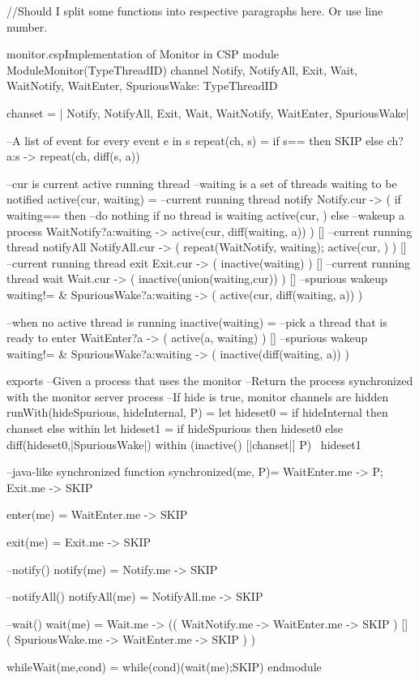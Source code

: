\documentclass{article}
\begin{document}
//Should I split some functions into respective paragraphs here. Or use line number. 
\begin{cspfloat}{monitor.csp}{Implementation of Monitor in CSP}
  module ModuleMonitor(TypeThreadID)
  channel
    Notify, NotifyAll, Exit, Wait,
    WaitNotify, WaitEnter, SpuriousWake: TypeThreadID

  chanset = {| Notify, NotifyAll, Exit, Wait, WaitNotify, WaitEnter, SpuriousWake|}

  --A list of event for every event e in s
  repeat(ch, s) =
    if s=={} then SKIP
    else ch?a:s -> repeat(ch, diff(s, {a}))

  --cur is current active running thread
  --waiting is a set of threads waiting to be notified
  active(cur, waiting) =
    --current running thread notify
    Notify.cur -> (
      if waiting=={} then 
        --do nothing if no thread is waiting
        active(cur, {})
      else
        --wakeup a process
        WaitNotify?a:waiting -> 
        active(cur, diff(waiting, {a}))
    ) []
    --current running thread notifyAll
    NotifyAll.cur -> (
      repeat(WaitNotify, waiting);
      active(cur, {})
    ) []
    --current running thread exit
    Exit.cur -> (
      inactive(waiting)
    ) []
    --current running thread wait
    Wait.cur -> (
      inactive(union(waiting,{cur}))
    ) []
    --spurious wakeup
    waiting!={} & SpuriousWake?a:waiting -> (
      active(cur, diff(waiting, {a}))
    )

  --when no active thread is running
  inactive(waiting) = 
    --pick a thread that is ready to enter
    WaitEnter?a -> (
      active(a, waiting)
    ) []
    --spurious wakeup
    waiting!={} & SpuriousWake?a:waiting -> (
      inactive(diff(waiting, {a}))
    )

exports
  --Given a process that uses the monitor
  --Return the process synchronized with the monitor server process
  --If hide is true, monitor channels are hidden
  runWith(hideSpurious, hideInternal, P) = 
    let hideset0 = if hideInternal then chanset else {} within
    let hideset1 = if hideSpurious then hideset0 else diff(hideset0,{|SpuriousWake|}) within
    (inactive({}) [|chanset|] P) \ hideset1
  
  --java-like synchronized function
  synchronized(me, P)=
    WaitEnter.me ->
    P;
    Exit.me ->
    SKIP

  enter(me) = 
    WaitEnter.me ->
    SKIP

  exit(me) =
    Exit.me -> 
    SKIP

  --notify()
  notify(me) = 
    Notify.me ->
    SKIP

  --notifyAll()
  notifyAll(me) =
    NotifyAll.me ->
    SKIP

  --wait()
  wait(me) =
    Wait.me -> ((
        WaitNotify.me ->
        WaitEnter.me ->
        SKIP
      ) [] (
        SpuriousWake.me ->
        WaitEnter.me ->
        SKIP
      )
    )
  
  whileWait(me,cond) =
    while(cond)(wait(me);SKIP)
endmodule
\end{cspfloat}
\end{document}
